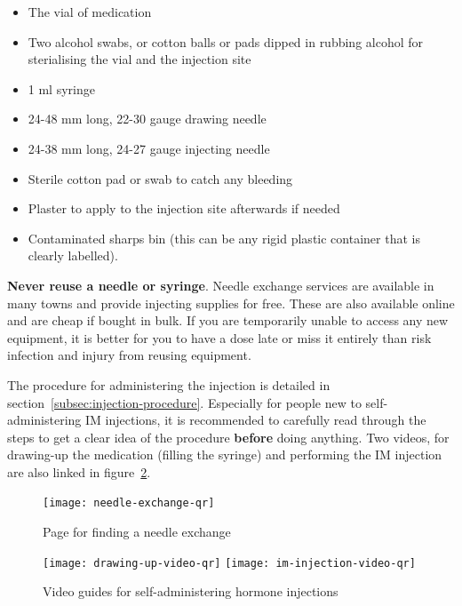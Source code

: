 \documentclass[twoside,a5paper]{article}
\begin{document}
\begin{itemize}
\item The vial of medication
\item Two alcohol swabs, or cotton balls or pads dipped in rubbing
  alcohol for sterialising the vial and the injection site
\item 1 ml syringe
\item 24-48 mm long, 22-30 gauge drawing needle
\item 24-38 mm long, 24-27 gauge injecting needle
\item Sterile cotton pad or swab to catch any bleeding
\item Plaster to apply to the injection site afterwards if needed
\item Contaminated sharps bin (this can be any rigid plastic container
  that is clearly labelled).
\end{itemize}

\textbf{Never reuse a needle or syringe}.  Needle exchange services
are available in many towns and provide injecting supplies for free.
These are also available online and are cheap if bought in bulk.  If
you are temporarily unable to access any new equipment, it is better
for you to have a dose late or miss it entirely than risk infection
and injury from reusing equipment.

The procedure for administering the injection is detailed in
section~\ref{subsec:injection-procedure}.  Especially for people new
to self-administering IM injections, it is recommended to carefully
read through the steps to get a clear idea of the procedure
\textbf{before} doing anything.  Two videos, for drawing-up the
medication (filling the syringe) and performing the IM injection are
also linked in figure~\ref{fig:im-injection-videos}.

\begin{figure}
  \centering
  \texttt{[image: needle-exchange-qr]}
  \caption{Page for finding a needle exchange}
  \label{fig:needle-exchange-qr}
\end{figure}

\begin{figure}
  \centering
  \texttt{[image: drawing-up-video-qr]}
  \hspace{2em}
  \texttt{[image: im-injection-video-qr]}
  \caption{Video guides for self-administering hormone injections}
  \label{fig:im-injection-videos}
\end{figure}

\cleardoublepage
\end{document}
